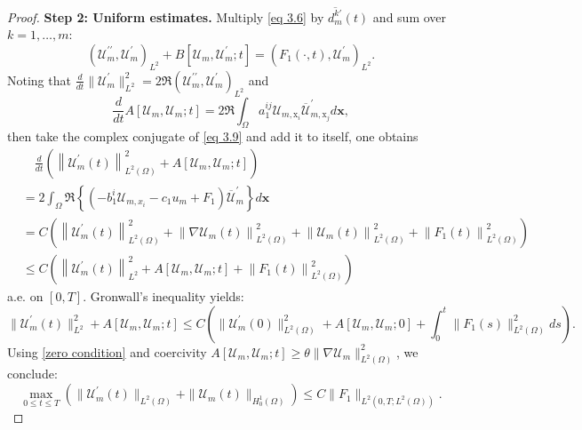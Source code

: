 \documentclass[11pt,reqno,oneside]{amsart}
\numberwithin{equation}{section}
\theoremstyle{definition}
\theoremstyle{remark}
\numberwithin{equation}{section}
\begin{document}
\begin{proof}
		
		\medskip
		\textbf{Step 2: Uniform estimates.}  
		Multiply \eqref{eq 3.6} by $\overline{d_m^{k\prime}}(t)$ and sum over $k=1,\dots,m$:
		\begin{equation}\label{eq 3.9}
			\left( \mathcal{U}^{\prime\prime}_m, \mathcal{U}^{\prime}_m \right)_{L^2} + B[\mathcal{U}_m, \mathcal{U}^{\prime}_m; t] = \left( F_1(\cdot,t), \mathcal{U}^{\prime}_m \right)_{L^2}.
		\end{equation}
		Noting that  
		$\frac{d}{dt} \| \mathcal{U}^{\prime}_m \|_{L^2}^2 = 2 \Re \left( \mathcal{U}^{\prime\prime}_m, \mathcal{U}^{\prime}_m \right)_{L^2}$  
		and  
		$$\frac{d}{dt} A[\mathcal{U}_m, \mathcal{U}_m; t] = 2 \Re \int_\Omega a^{ij}_1 \mathcal{U}_{m,\mathrm{x}_i} \overline{\mathcal{U}}^{\prime}_{m,\mathrm{x}_j}  d\mathbf{x},$$  
		then take the complex conjugate of \eqref{eq 3.9} and add it to itself, one obtains 
		\begin{equation*}
			\begin{aligned}
				&\quad\frac{d}{dt}\left( \left\| \mathcal{U}_{m}^{\prime}\left( t \right) \right\| _{L^2(\Omega)}^{2}+A\left[ \mathcal{U}_m,\mathcal{U}_m;t \right] \right) 
				\\
				&=2\int_{\Omega}{\Re\left\{ \left(- b^i_1 \mathcal{U}_{m,x_i}-c_1u_m+F_1 \right) \overline{\mathcal{U}}_{m}^{\prime} \right\} d\mathbf{x}}
				\\
				&=C\left( \left\| \mathcal{U}_{m}^{\prime}\left( t \right) \right\| _{L^2(\Omega)}^{2}+\left\| \nabla \mathcal{U}_m\left( t \right) \right\| _{L^2(\Omega)}^{2}+\left\| \mathcal{U}_m\left( t \right) \right\| _{L^2(\Omega)}^{2}+\left\| F_1\left( t \right) \right\| _{L^2(\Omega)}^{2} \right) 
				\\
				&\leqslant C\left( \left\| \mathcal{U}_{m}^{\prime}\left( t \right) \right\| _{L^2}^{2}+A\left[ \mathcal{U}_m,\mathcal{U}_m;t \right] +\left\| F_1\left( t \right) \right\| _{L^2(\Omega)}^{2} \right) 
			\end{aligned}
		\end{equation*}
		a.e. on $[0,T]$. Gronwall's inequality yields:
		\begin{equation*}
			\| \mathcal{U}_{m}^{\prime}(t) \|_{L^2}^2 + A[\mathcal{U}_m, \mathcal{U}_m; t] 
			\leqslant C \left( \| \mathcal{U}_{m}^{\prime}(0) \|_{L^2(\Omega)}^2 + A[\mathcal{U}_m, \mathcal{U}_m; 0] + \int_0^t \| F_1(s) \|_{L^2(\Omega)}^2  ds \right).
		\end{equation*}
		Using \eqref{zero condition} and coercivity $A[\mathcal{U}_m, \mathcal{U}_m; t] \geqslant \theta \| \nabla \mathcal{U}_m \|_{L^2(\Omega)}^2$, we conclude:
		\begin{equation}\label{estimate for u_m}
			\max_{0 \leqslant t \leqslant T} \left( \| \mathcal{U}_{m}^{\prime}(t) \|_{L^2(\Omega)} + \| \mathcal{U}_m(t) \|_{H^1_0(\Omega)} \right) \leqslant C \| F_1 \|_{L^2(0,T;L^2(\Omega))}.
		\end{equation}
		

\end{proof}
\end{document}
